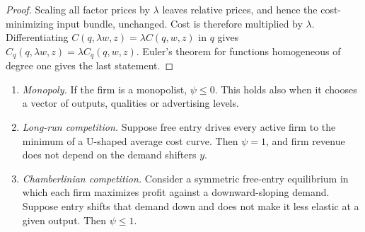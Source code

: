 \begin{proof}
Scaling all factor prices by $\lambda$ leaves relative prices, and hence the cost-minimizing input bundle,
unchanged. Cost is therefore multiplied by $\lambda$. Differentiating $C(q, \lambda w, z) = \lambda C(q, w,
z)$ in $q$ gives $C_q(q, \lambda w, z) = \lambda C_q(q, w, z)$. Euler's theorem for functions homogeneous of
degree one gives the last statement.
\end{proof}

\begin{proposition}\label{prop:03-panzar-rosse}
\leavevmode
\begin{enumerate}[label=(\roman*)]
  \item \emph{Monopoly.} If the firm is a monopolist, $\psi \le 0$. This holds also when it chooses a vector
  of outputs, qualities or advertising levels.
  \item \emph{Long-run competition.} Suppose free entry drives every active firm to the minimum of a U-shaped
  average cost curve. Then $\psi = 1$, and firm revenue does not depend on the demand shifters $y$.
  \item \emph{Chamberlinian competition.} Consider a symmetric free-entry equilibrium in which each firm
  maximizes profit against a downward-sloping demand. Suppose entry shifts that demand down and does not make
  it less elastic at a given output. Then $\psi \le 1$.
\end{enumerate}
\end{proposition}

